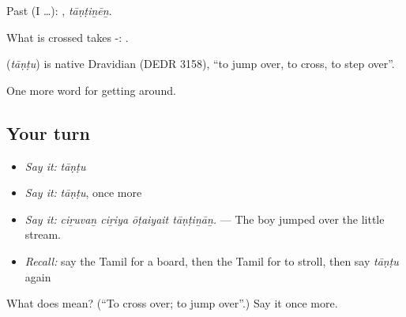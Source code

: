 Past (I …): , \emph{tāṇṭiṉēṉ}.

What is crossed takes -:  .

\begin{cousinweb}
\textbf{} (\emph{tāṇṭu}) is native Dravidian (DEDR 3158), \textquotedblleft{}to jump over, to cross, to step over\textquotedblright{}.
\end{cousinweb}

\begin{grammarlens}[title={What you've built}]
One more word for getting around.
\end{grammarlens}

\subsection*{Your turn}
\begin{itemize}
\raggedright
  \item \emph{Say it:} \emph{tāṇṭu}
  \item \emph{Say it:} \emph{tāṇṭu}, once more
  \item \emph{Say it:} \emph{ciṟuvaṉ ciṟiya ōṭaiyait tāṇṭiṉāṉ.} — The boy jumped over the little stream.
  \item \emph{Recall:} say the Tamil for a board, then the Tamil for to stroll, then say \emph{tāṇṭu} again
\end{itemize}

\begin{tcolorbox}[breakable,colback=teal!4,colframe=teal!35!black,title={Before you move on}]
What does  mean? (\textquotedblleft{}To cross over; to jump over\textquotedblright{}.) Say it once more.
\end{tcolorbox}
